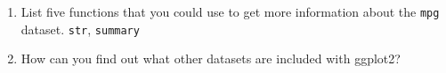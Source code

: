 \documentclass[]{book}
\newenvironment{Shaded}{\begin{snugshade}}{\end{snugshade}}
\newcommand{\KeywordTok}[1]{\textcolor[rgb]{0.13,0.29,0.53}{\textbf{#1}}}
\newcommand{\DataTypeTok}[1]{\textcolor[rgb]{0.13,0.29,0.53}{#1}}
\newcommand{\DecValTok}[1]{\textcolor[rgb]{0.00,0.00,0.81}{#1}}
\newcommand{\StringTok}[1]{\textcolor[rgb]{0.31,0.60,0.02}{#1}}
\newcommand{\OperatorTok}[1]{\textcolor[rgb]{0.81,0.36,0.00}{\textbf{#1}}}
\newcommand{\NormalTok}[1]{#1}
\begin{document}
\begin{enumerate}
\def\labelenumi{\arabic{enumi}.}
\item
  List five functions that you could use to get more information about
  the \texttt{mpg} dataset. \texttt{str}, \texttt{summary}
\item
  How can you find out what other datasets are included with ggplot2?

\begin{Shaded}
\end{Shaded}


\end{enumerate}
\end{document}
